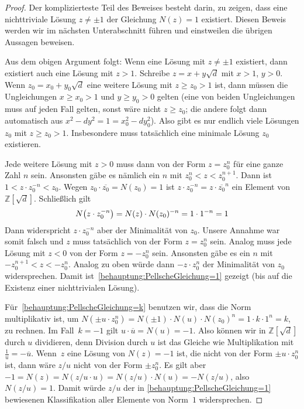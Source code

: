 \begin{proof}
	Der komplizierteste Teil des Beweises besteht darin, zu zeigen, dass eine nichttriviale Lösung $z\neq \pm1$ der Gleichung $N(z)=1$ existiert. Diesen Beweis werden wir im nächsten Unterabschnitt führen und einstweilen die übrigen Aussagen beweisen.
	
	Aus dem obigen Argument folgt: Wenn eine Lösung mit $z\neq \pm 1$ existiert, dann existiert auch eine Lösung mit $z>1$. Schreibe $z=x+y\sqrt{d}$ mit $x> 1$, $y> 0$. Wenn $z_0=x_0+y_0\sqrt{d}$ eine weitere Lösung mit $z\geqslant z_0>1$ ist, dann müssen die Ungleichungen $x\geqslant x_0> 1$ und $y\geqslant y_0> 0$ gelten (eine von beiden Ungleichungen muss auf jeden Fall gelten, sonst wäre nicht $z\geqslant z_0$; die andere folgt dann automatisch aus $x^2-dy^2=1=x_0^2-dy_0^2$). Also gibt es nur endlich viele Lösungen $z_0$ mit $z\geqslant z_0>1$. Insbesondere muss tatsächlich eine minimale Lösung $z_0$ existieren.
	
	Jede weitere Lösung mit $z> 0$ muss dann von der Form $z=z_0^n$ für eine ganze Zahl $n$ sein. Ansonsten gäbe es nämlich ein $n$ mit $z_0^{n}<z<z_0^{n+1}$. Dann ist $1<z\cdot z_0^{-n}<z_0$. Wegen $z_0\cdot \overline{z_0}=N(z_0)=1$ ist $z\cdot z_0^{-n}=z\cdot \overline{z_0}^{n}$ ein Element von $\mathbb Z[\sqrt{d}]$. Schließlich gilt
	\begin{equation*}
		N\parens*{z\cdot z_0^{-n}}=N(z)\cdot N(z_0)^{-n}=1\cdot 1^{-n}=1
	\end{equation*}
	Dann widerspricht $z\cdot z_0^{-n}$ aber der Minimalität von $z_0$. Unsere Annahme war somit falsch und $z$ muss tatsächlich von der Form $z=z_0^n$ sein. Analog muss jede Lösung mit $z<0$ von der Form $z=-z_0^n$ sein. Ansonsten gäbe es ein $n$ mit $-z_0^{n+1}<z<-z_0^n$. Analog zu oben würde dann $-z\cdot z_0^n$ der Minimalität von $z_0$ widersprechen. Damit ist~\ref{behauptung:PellscheGleichung=1} gezeigt (bis auf die Existenz einer nichttrivialen Lösung).
	
	Für~\ref{behauptung:PellscheGleichung=k} benutzen wir, dass die Norm multiplikativ ist, um $N(\pm u\cdot z_0^n)=N(\pm 1)\cdot N(u)\cdot N(z_0)^n=1\cdot k\cdot 1^n=k$, zu rechnen. Im Fall~$k=-1$ gilt $u\cdot \overline{u}=N(u)=-1$. Also können wir in $\mathbb Z[\sqrt{d}]$ durch $u$ dividieren, denn Division durch $u$ ist das Gleiche wie Multiplikation mit $\frac 1u=-\overline{u}$. Wenn~$z$ eine Lösung von $N(z)=-1$ ist, die nicht von der Form $\pm u\cdot z_0^n$ ist, dann wäre $z/u$ nicht von der Form $\pm z_0^n$. Es gilt aber $-1=N(z)=N(z/u\cdot u)=N(z/u)\cdot N(u)=-N(z/u)$, also $N(z/u)=1$. Damit würde $z/u$ der in \ref{behauptung:PellscheGleichung=1} bewiesenen Klassifikation aller Elemente von Norm~$1$ widersprechen.
\end{proof}

